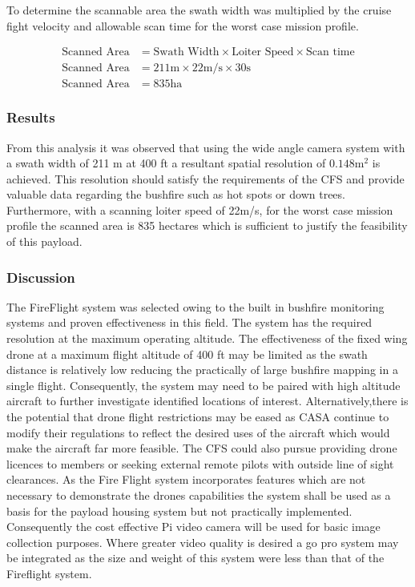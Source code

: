 To determine the scannable area the swath width was multiplied by the cruise fight velocity and allowable scan time for the worst case mission profile.   

\begin{align*}
    \text{Scanned Area} &= \text{Swath Width}\times \text{Loiter Speed}\times \text{Scan time}\\
    \text{Scanned Area} &= 211\text{m}\times 22 \text{m}/\text{s}\times30\text{s} \\
    \text{Scanned Area} &= 835 \text{ha}
  \end{align*}

\subsubsection{Results}
From this analysis it was observed that using the wide angle camera system with a swath width of 211 m at 400 ft a resultant spatial resolution of $0.148\text{m}^2$ is achieved. This resolution should satisfy the requirements of the CFS and provide valuable data regarding the bushfire such as hot spots or down trees. Furthermore, with a scanning loiter speed of 22m/s, for the worst case mission profile the scanned area is 835 hectares which is sufficient to justify the feasibility of this payload. 


\subsubsection{Discussion}
The FireFlight system was selected owing to the built in bushfire monitoring systems and proven effectiveness in this field. The system has the required resolution at the maximum operating altitude. The effectiveness of the fixed wing drone at a maximum flight altitude of 400 ft may be limited as the swath distance is relatively low reducing the practically of large bushfire mapping in a single flight. Consequently, the system may need to be paired with high altitude aircraft to further investigate identified locations of interest. Alternatively,there is the potential that drone flight restrictions may be eased as CASA continue to modify their regulations to reflect the desired uses of the aircraft which would make the aircraft far more feasible. The CFS could also pursue providing drone licences to members or seeking external remote pilots with outside line of sight clearances.
As the Fire Flight system incorporates features which are not necessary to demonstrate the drones capabilities the system shall be used as a basis for the payload housing system but not practically implemented. Consequently the cost effective Pi video camera will be used for basic image collection purposes. Where greater video quality is desired a go pro system may be integrated as the size and weight of this system were less than that of the Fireflight system.

